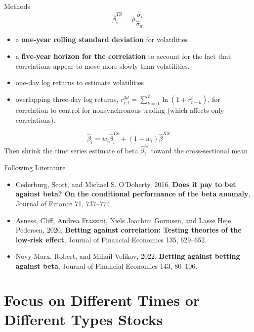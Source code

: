 \documentclass[10pt]{beamer}
\begin{document}
\begin{frame}{Methods}
    \begin{equation}
\hat{\beta}_i^{TS}=\hat{\rho} \frac{\hat{\sigma}_i}{\hat{\sigma}_m}
\end{equation}
\begin{itemize}
    \item a \textbf{one-year rolling standard deviation} for volatilities 
    \item a \textbf{five-year horizon for the correlation} to account for the fact that correlations appear to move more slowly than volatilities.
    \item one-day log returns to estimate volatilities
    \item overlapping three-day log returns, $r_{i, t}^{3 d}=\sum_{k=0}^2 \ln \left(1+r_{t+k}^i\right)$, for correlation to control for nonsynchronous trading (which affects only correlations).
\end{itemize}

\begin{equation}
\hat{\beta}_i=w_i \hat{\beta}_i^{T S}+\left(1-w_i\right) \hat{\beta}^{X S}
\end{equation}
Then shrink the time series estimate of beta $\hat{\beta}_i^{t s}$ toward the cross-sectional mean
\end{frame}

\begin{frame}{Following Literature}
\begin{itemize}
    \item Cederburg, Scott, and Michael S. O’Doherty, 2016, \textbf{Does it pay to bet against beta? On the conditional performance of the beta anomaly}, Journal of Finance 71, 737–774.
    \item Asness, Cliff, Andrea Frazzini, Niels Joachim Gormsen, and Lasse Heje Pedersen, 2020, \textbf{Betting against correlation: Testing theories of the low-risk effect}, Journal of Financial Economics 135, 629–652.
   \item Novy-Marx, Robert, and Mihail Velikov, 2022, \textbf{Betting against betting against beta}, Journal of Financial Economics 143, 80–106.
\end{itemize}
\end{frame}

\section{Focus on Different Times or Different Types Stocks}
\end{document}
